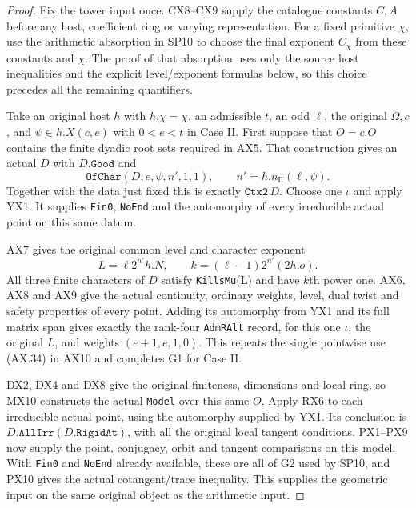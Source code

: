 \begin{proof}
Fix the tower input once.  CX8--CX9 supply the catalogue constants
$C,A$ before any host, coefficient ring or varying representation.
For a fixed primitive $\chi$, use the arithmetic absorption in
SP10 to choose the final exponent $C_\chi$ from these constants
and $\chi$.  The proof of that absorption uses only the source
host inequalities and the explicit level/exponent formulas below,
so this choice precedes all the remaining quantifiers.

Take an original host $h$ with $h.\chi=\chi$, an admissible
$t$, an odd $\ell$, the original $\Omega,c$, and
$\psi\in h.X(c,e)$ with $0<e<t$ in Case II.
First suppose that $O=c.O$ contains the finite dyadic root sets
required in AX5.  That construction gives an actual $D$ with
$D.\texttt{Good}$ and
\[
          \texttt{OfChar}(D,e,\psi,n',1,1),
                         \qquad n'=h.n_{\mathrm{II}}(\ell,\psi).
                                                               \tag{YX.4}
\]
Together with the data just fixed this is exactly
$\texttt{Ctx2}\,D$.  Choose one $\iota$ and apply YX1.
It supplies \texttt{Fin0}, \texttt{NoEnd} and the automorphy
of every irreducible actual point on this same datum.

AX7 gives the original common level and character exponent
\[
           L=\ell 2^{n'}h.N,
       \qquad k=(\ell-1)2^{n'}(2h.o).
                                                               \tag{YX.5}
\]
All three finite characters of $D$ satisfy
\texttt{KillsMu}(L) and have $k$th power one.
AX6, AX8 and AX9 give the actual continuity, ordinary weights,
level, dual twist and safety properties of every point.
Adding its automorphy from YX1 and its full matrix span gives
exactly the rank-four \texttt{AdmRAlt} record, for this one
$\iota$, the original $L$, and weights $(e+1,e,1,0)$.
This repeats the single pointwise use (AX.34) in AX10 and
completes G1 for Case II.

DX2, DX4 and DX8 give the original finiteness, dimensions and
local ring, so MX10 constructs the actual \texttt{Model}
over this same $O$.  Apply RX6 to each irreducible actual point,
using the automorphy supplied by YX1.  Its conclusion is
$D.\texttt{AllIrr}(D.\texttt{RigidAt})$, with all the original
local tangent conditions.  PX1--PX9 now supply the point,
conjugacy, orbit and tangent comparisons on this model.
With \texttt{Fin0} and \texttt{NoEnd} already available,
these are all of G2 used by SP10, and PX10 gives the actual
cotangent/trace inequality.  This supplies the geometric input
on the same original object as the arithmetic input.


\end{proof}
